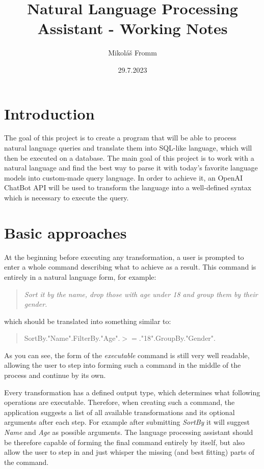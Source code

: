 \documentclass[11pt]{article}
\title{Natural Language Processing Assistant - Working Notes}
\author{Mikoláš Fromm}
\date{29.7.2023}
\begin{document}
\maketitle

\section{Introduction}

The goal of this project is to create a program that will be able to process natural language queries and translate them into SQL-like language, which will then be executed on a database. The main goal of this project is to work with a natural language and find the best way to parse it with today's favorite language models into custom-made query language. In order to achieve it, an OpenAI ChatBot API will be used to transform the language into a well-defined syntax which is necessary to execute the query.


\section{Basic approaches}

At the beginning before executing any transformation, a user is prompted to enter a whole command describing what to achieve as a result. This command is entirely in a natural language form, for example: \begin{quotation}\textit{Sort it by the name, drop those with age under 18 and group them by their gender.}\end{quotation} which should be translated into something similar to: \begin{quotation}SortBy."Name".FilterBy."Age".\begin{math}>=\end{math}."18".GroupBy."Gender".\end{quotation}

As you can see, the form of the \textit{executable} command is still very well readable, allowing the user to step into forming such a command in the middle of the process and continue by its own. 

Every transformation has a defined output type, which determines what following operations are executable. Therefore, when creating such a command, the application suggests a list of all available transformations and its optional arguments after each step. For example after submitting \textit{SortBy} it will suggest \textit{Name} and \textit{Age} as possible arguments.
The language processing assistant should be therefore capable of forming the final command entirely by itself, but also allow the user to step in and just whisper the missing (and best fitting) parts of the command.
\end{document}
